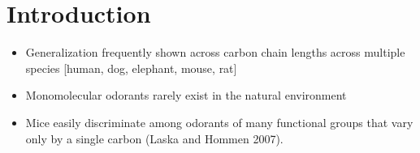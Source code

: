 \section{Introduction}
\label{sec:introduction}
\begin{itemize}
\item Generalization frequently shown across carbon chain lengths across multiple species [human, dog, elephant, mouse, rat]
\item Monomolecular odorants rarely exist in the natural environment
\item Mice easily discriminate among odorants of many functional groups that vary only by a single carbon (Laska and Hommen 2007).
\end{itemize}
